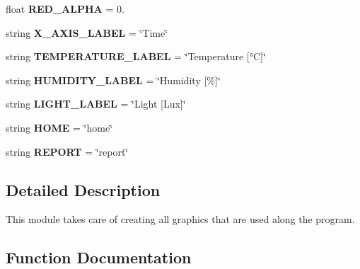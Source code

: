 \begin{DoxyCompactItemize}
\item 
\mbox{\label{namespacegraph__functions_a74fc26c3b09ec2f52a21d2ccb19e3993}} 
float {\bfseries R\+E\+D\+\_\+\+A\+L\+P\+HA} = 0.
\item 
\mbox{\label{namespacegraph__functions_a03134600f2d56901268344a7b1b599e4}} 
string {\bfseries X\+\_\+\+A\+X\+I\+S\+\_\+\+L\+A\+B\+EL} = \char`\"{}Time\char`\"{}
\item 
\mbox{\label{namespacegraph__functions_a080d1a910ac77dbbb5c9f3aaaa1f78ee}} 
string {\bfseries T\+E\+M\+P\+E\+R\+A\+T\+U\+R\+E\+\_\+\+L\+A\+B\+EL} = \char`\"{}Temperature \mbox{[}°C\mbox{]}\char`\"{}
\item 
\mbox{\label{namespacegraph__functions_aef8a3c19f2b33786671f76b76926127e}} 
string {\bfseries H\+U\+M\+I\+D\+I\+T\+Y\+\_\+\+L\+A\+B\+EL} = \char`\"{}Humidity \mbox{[}\%\mbox{]}\char`\"{}
\item 
\mbox{\label{namespacegraph__functions_a72eecccc3e489b7da3787adbfa48d53a}} 
string {\bfseries L\+I\+G\+H\+T\+\_\+\+L\+A\+B\+EL} = \char`\"{}Light \mbox{[}Lux\mbox{]}\char`\"{}
\item 
\mbox{\label{namespacegraph__functions_a0f16651da1bd815ed4c75807379ea311}} 
string {\bfseries H\+O\+ME} = \char`\"{}home\char`\"{}
\item 
\mbox{\label{namespacegraph__functions_a8a23807c60ec36a94109d6b4ba95adc0}} 
string {\bfseries R\+E\+P\+O\+RT} = \char`\"{}report\char`\"{}
\end{DoxyCompactItemize}


\subsection{Detailed Description}
This module takes care of creating all graphics that are used along the program. 



\subsection{Function Documentation}
\mbox{\label{namespacegraph__functions_aa95a646a4b7dc2ddb3e399bc82be75e6}} 
